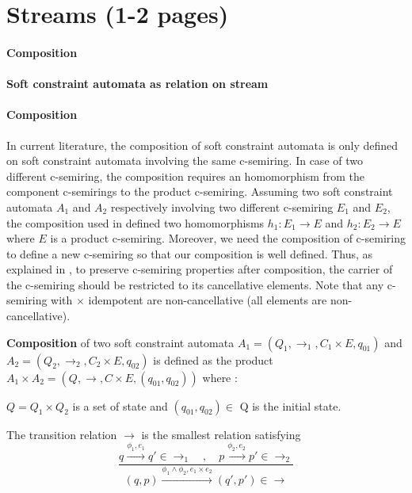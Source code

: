 \section{\label{sec:Streams}Streams (1-2 pages)}

\paragraph{Composition}

\paragraph{Soft constraint automata as relation on stream}

\paragraph{Composition} 
In current literature, the composition of soft constraint automata is only defined on soft constraint automata involving the same c-semiring. In case of two different c-semiring, the composition requires an homomorphism from the component c-semirings to the product c-semiring. Assuming two soft constraint automata $A_1$ and $A_2$ respectively involving two different c-semiring $E_1$ and $E_2$, the composition used in \cite{?} defined two homomorphisms $h_1 : E_1 \rightarrow E$ and $h_2 : E_2 \rightarrow E$ where $E$ is a product c-semiring. Moreover, we need the composition of c-semiring to define a new c-semiring so that our composition is well defined. Thus, as explained in \cite{?}, to preserve c-semiring properties after composition, the carrier of the c-semiring should be restricted to its cancellative elements. Note that any c-semiring with $\times$ idempotent are non-cancellative (all elements are non-cancellative).
\begin{definition}
	\textbf{Composition} of two soft constraint automata $A_1=(Q_1,\rightarrow_1, C_1 \times E, q_{01})$ and $A_2=(Q_2,\rightarrow_2, C_2\times E, q_{02})$ is defined as the product $ A_1 \times A_2 = (Q, \rightarrow, C\times E, (q_{01},q_{02}) )$ where : 
	\begin{list}{-}{ }
		\item $Q= Q_1 \times Q_2 $ is a set of state and $(q_{01},q_{02})\in$ Q is the initial state.
		\item The transition relation $\rightarrow$ is the smallest relation satisfying
		$$
		\frac{q \xrightarrow{\phi_1,e_1} q' \in \rightarrow _1 \quad , \quad p\xrightarrow{\phi_2,e_2}p' \in \rightarrow_2}{(q,p) \xrightarrow{\phi_1 \land \phi_2,e_1 \times e_2}(q',p') \in \rightarrow}
		$$
	\end{list}
\end{definition}
